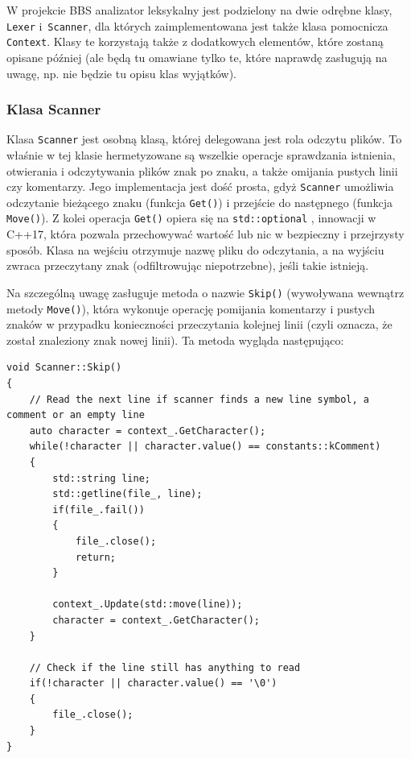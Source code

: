 W projekcie BBS analizator leksykalny jest podzielony na dwie odrębne klasy, \texttt{Lexer} i~\texttt{Scanner}, dla których zaimplementowana jest także klasa pomocnicza \texttt{Context}. Klasy te korzystają także z dodatkowych elementów, które zostaną opisane później (ale będą tu omawiane tylko te, które naprawdę zasługują na uwagę, np. nie będzie tu opisu klas wyjątków).

\subsubsection{Klasa Scanner}
Klasa \texttt{Scanner} jest osobną klasą, której delegowana jest rola odczytu plików. To właśnie w tej klasie hermetyzowane są wszelkie operacje sprawdzania istnienia, otwierania i odczytywania plików znak po znaku, a także omijania pustych linii czy komentarzy. Jego implementacja jest dość prosta, gdyż \texttt{Scanner} umożliwia odczytanie bieżącego znaku (funkcja \texttt{Get()}) i przejście do następnego (funkcja \texttt{Move()}). Z kolei operacja \texttt{Get()} opiera się na \texttt{std::optional} \cite{cpp_optional}, innowacji w C++17, która pozwala przechowywać wartość lub nic w bezpieczny i przejrzysty sposób. Klasa na wejściu otrzymuje nazwę pliku do odczytania, a na wyjściu zwraca przeczytany znak (odfiltrowując niepotrzebne), jeśli takie istnieją.

Na szczególną uwagę zasługuje metoda o nazwie \texttt{Skip()} (wywoływana wewnątrz metody \texttt{Move()}), która wykonuje operację pomijania komentarzy i pustych znaków w przypadku konieczności przeczytania kolejnej linii (czyli oznacza, że został znaleziony znak nowej linii). Ta metoda wygląda następująco:

\begin{lstlisting}[label=list:scanner,caption=Metoda Scanner::Skip(),basicstyle=\footnotesize\ttfamily]
void Scanner::Skip()
{
    // Read the next line if scanner finds a new line symbol, a comment or an empty line
    auto character = context_.GetCharacter();
    while(!character || character.value() == constants::kComment)
    {
        std::string line;
        std::getline(file_, line);
        if(file_.fail())
        {
            file_.close();
            return;
        }
    
        context_.Update(std::move(line));
        character = context_.GetCharacter();
    }
    
    // Check if the line still has anything to read
    if(!character || character.value() == '\0')
    {
        file_.close();
    }
}
\end{lstlisting}

